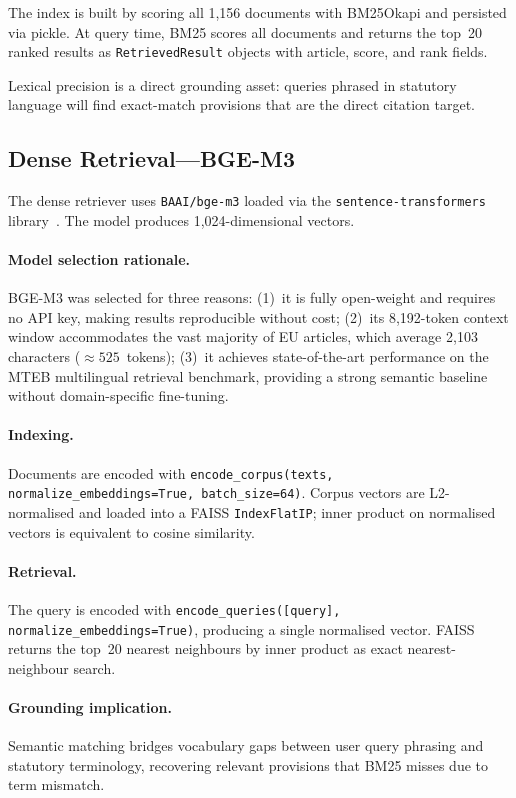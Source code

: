 \documentclass{iosart2x}
\newcommand{\bgem}{BGE-M3\xspace}
\begin{document}
The index is built by scoring all 1,156 documents with BM25Okapi and
persisted via pickle.  At query time, BM25 scores all documents and
returns the top~20 ranked results as \texttt{RetrievedResult} objects
with article, score, and rank fields.

Lexical precision is a direct grounding asset: queries phrased in
statutory language will find exact-match provisions that are the
direct citation target.

\subsection{Dense Retrieval---BGE-M3}
\label{sec:dense}

The dense retriever uses \texttt{BAAI/bge-m3} loaded via the
\texttt{sentence-transformers} library~\cite{reimers2019sbert,chen2024bgem3}.
The model produces 1,024-dimensional vectors.

\paragraph{Model selection rationale.}  \bgem was selected for three
reasons: (1)~it is fully open-weight and requires no API key, making
results reproducible without cost; (2)~its 8,192-token context window
accommodates the vast majority of EU articles, which average 2,103
characters (${\approx}525$~tokens); (3)~it achieves state-of-the-art
performance on the MTEB multilingual retrieval benchmark, providing a
strong semantic baseline without domain-specific fine-tuning.

\paragraph{Indexing.}  Documents are encoded with
\texttt{encode\_corpus(texts, normalize\_embeddings=True,
batch\_size=64)}.  Corpus vectors are L2-normalised and loaded into a
FAISS \texttt{IndexFlatIP}; inner product on normalised vectors is
equivalent to cosine similarity.

\paragraph{Retrieval.}  The query is encoded with
\texttt{encode\_queries([query], normalize\_embeddings=True)},
producing a single normalised vector.  FAISS returns the top~20
nearest neighbours by inner product as exact nearest-neighbour search.

\paragraph{Grounding implication.}  Semantic matching bridges
vocabulary gaps between user query phrasing and statutory terminology,
recovering relevant provisions that BM25 misses due to term mismatch.
\end{document}
